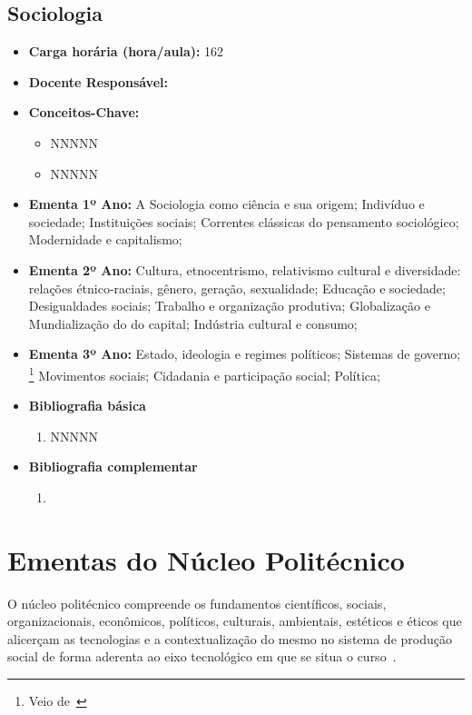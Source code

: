 \documentclass[11pt,fleqn]{book} %
\newcommand{\VER}[1]{\begingroup\color{red}#1\endgroup}
\begin{document}
\subsection{Sociologia}\label{disc:sociologia}
\begin{itemize}
	\item \textbf{Carga horária (hora/aula):} 162
	\item \textbf{Docente Responsável:}
	\item \textbf{Conceitos-Chave:}
	\begin{itemize}
		\item NNNNN
		\item NNNNN
	\end{itemize}
	\item \textbf{Ementa 1º Ano:} 
	A Sociologia como ciência e sua origem; 
	Indivíduo e sociedade; 
	Instituições sociais; 
	Correntes clássicas do pensamento sociológico; 
	Modernidade e capitalismo;
	\item \textbf{Ementa 2º Ano:} 
	Cultura, etnocentrismo, relativismo cultural e diversidade: relações étnico-raciais, gênero, geração, sexualidade;
	Educação e sociedade; 
	Desigualdades sociais; 
	Trabalho e organização produtiva; 
	Globalização e Mundialização do do capital; 
	Indústria cultural e consumo;
	\item \textbf{Ementa 3º Ano:} 
	\VER{	
	Estado, ideologia e regimes políticos; 
	Sistemas de governo;
	}\footnote{Veio de~} 
	Movimentos sociais;
	Cidadania e participação social;
	Política;
	\item \textbf{Bibliografia básica}
	\begin{enumerate}
		\item NNNNN
	\end{enumerate}
	\item \textbf{Bibliografia complementar}
	\begin{enumerate}
		\item 
	\end{enumerate}	
\end{itemize}

\newpage
\section{Ementas do Núcleo Politécnico}\label{ementasPolitecnico}
\indent

O núcleo politécnico compreende os fundamentos científicos, sociais, organizacionais, econômicos, políticos, culturais, ambientais, estéticos e éticos que alicerçam as tecnologias e a contextualização do mesmo no sistema de produção social de forma aderenta ao eixo tecnológico em que se situa o curso~\cite{Resolucao06De2012}.
\end{document}
